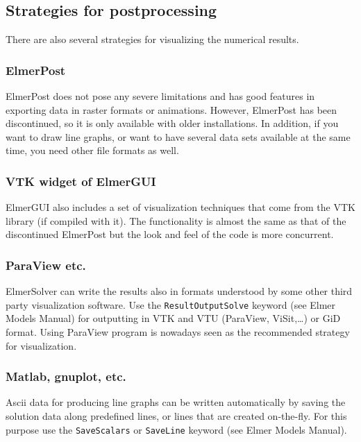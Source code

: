 \subsection{Strategies for postprocessing}

There are also several strategies for visualizing the numerical results.


\subsubsection*{ElmerPost}
ElmerPost does not pose any severe limitations 
and has good features in exporting data in raster formats or animations.
However, ElmerPost has been discontinued, so it is only available with older
installations. In addition, if you want to draw line graphs, 
or want to have several data sets available at the same
time, you need other file formats as well. 

\subsubsection*{VTK widget of ElmerGUI}
ElmerGUI also includes a set of visualization techniques that come from the VTK library (if compiled with it). 
The functionality is almost the same as that of the discontinued ElmerPost but the look and feel of the code is more concurrent. 

\subsubsection*{ParaView etc.}
ElmerSolver can write the results also in formats understood by some other third party visualization 
software. Use the \texttt{ResultOutputSolve} keyword (see Elmer Models Manual) for outputting 
in VTK and VTU (ParaView, ViSit,\ldots ) or GiD format. Using ParaView program
is nowadays seen as the recommended strategy for visualization.

\subsubsection*{Matlab, gnuplot, etc.}
Ascii data for producing line graphs can be written automatically by saving the 
solution data along predefined lines, or lines that are created on-the-fly.
For this purpose use the \texttt{SaveScalars} or \texttt{SaveLine} keyword (see Elmer Models Manual).


